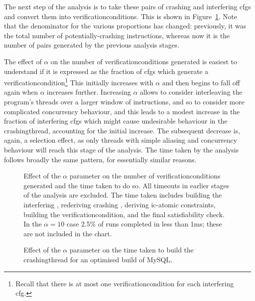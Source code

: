The next step of the analysis is to take these pairs of crashing
{\StateMachines} and interfering \glspl{cfg} and convert them into
\glspl{verificationcondition}.  This is shown in
Figure~\ref{fig:perf:alpha:gvc:unopt}.  Note that the denominator for
the various proportions has changed: previously, it was the total
number of potentially-crashing instructions, whereas now it is the
number of pairs generated by the previous analysis stages.

The effect of $\alpha$ on the number of \glspl{verificationcondition}
generated is easiest to understand if it is expressed as the fraction
of \glspl{cfg} which generate a
\gls{verificationcondition}\footnote{Recall that there is at most one
  \gls{verificationcondition} for each interfering \gls{cfg}.}  This
initially increases with $\alpha$ and then begins to fall off again
when $\alpha$ increases further.  Increasing $\alpha$ allows
{\technique} to consider interleaving the program's threads over a
larger window of instructions, and so to consider more complicated
concurrency behaviour, and this leads to a modest increase in the
fraction of interfering \glspl{cfg} which might cause undesirable
behaviour in the \gls{crashingthread}, accounting for the initial
increase.  The subsequent decrease is, again, a selection effect, as
only threads with simple aliasing and concurrency behaviour will reach
this stage of the analysis.  The time taken by the analysis follows
broadly the same pattern, for essentially similar reasons.

\begin{figure}
  \centerline{}
  \caption{Effect of the $\alpha$ parameter on the number of
    \glspl{verificationcondition} generated and the time taken to do
    so.  All timeouts in earlier stages of the analysis are excluded.
    The time taken includes building the interfering {\StateMachine},
    rederiving crashing {\StateMachine}, deriving \gls{ic-atomic}
    constraints, building the \gls{verificationcondition}, and the
    final satisfiability check.  In the $\alpha = 10$ case 2.5\% of
    runs completed in less than 1ms; these are not included in the
    chart.}
  \label{fig:perf:alpha:gvc:unopt}
\end{figure}

\begin{figure}
  
  \caption{Effect of the $\alpha$ parameter on the time taken to build
    the \gls{crashingthread} {\StateMachines} for an optimised build
    of MySQL.}
  \label{fig:perf:alpha:bpm:opt}
\end{figure}

